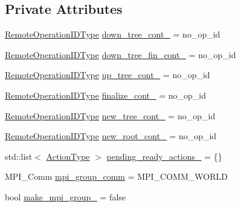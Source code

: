 \subsection*{Private Attributes}
\begin{DoxyCompactItemize}
\item 
\hyperlink{namespacevt_1_1group_a73f2624ddeb535b39a08b6524f26b244}{Remote\+Operation\+I\+D\+Type} \hyperlink{structvt_1_1group_1_1_info_coll_aa6f3626398eb4473b21bfb2a43ba3c96}{down\+\_\+tree\+\_\+cont\+\_\+} = no\+\_\+op\+\_\+id
\item 
\hyperlink{namespacevt_1_1group_a73f2624ddeb535b39a08b6524f26b244}{Remote\+Operation\+I\+D\+Type} \hyperlink{structvt_1_1group_1_1_info_coll_a05eef11154e3dc70bb84c6e3b4c3be6c}{down\+\_\+tree\+\_\+fin\+\_\+cont\+\_\+} = no\+\_\+op\+\_\+id
\item 
\hyperlink{namespacevt_1_1group_a73f2624ddeb535b39a08b6524f26b244}{Remote\+Operation\+I\+D\+Type} \hyperlink{structvt_1_1group_1_1_info_coll_acd4c40fa52015c16a54d9e793cecc700}{up\+\_\+tree\+\_\+cont\+\_\+} = no\+\_\+op\+\_\+id
\item 
\hyperlink{namespacevt_1_1group_a73f2624ddeb535b39a08b6524f26b244}{Remote\+Operation\+I\+D\+Type} \hyperlink{structvt_1_1group_1_1_info_coll_aa767d1c96a39903722351cd0cf758a94}{finalize\+\_\+cont\+\_\+} = no\+\_\+op\+\_\+id
\item 
\hyperlink{namespacevt_1_1group_a73f2624ddeb535b39a08b6524f26b244}{Remote\+Operation\+I\+D\+Type} \hyperlink{structvt_1_1group_1_1_info_coll_a80e7a5ae888fb9e6fae7e078caa773b4}{new\+\_\+tree\+\_\+cont\+\_\+} = no\+\_\+op\+\_\+id
\item 
\hyperlink{namespacevt_1_1group_a73f2624ddeb535b39a08b6524f26b244}{Remote\+Operation\+I\+D\+Type} \hyperlink{structvt_1_1group_1_1_info_coll_a95949a66470f57b28891e904902a3d51}{new\+\_\+root\+\_\+cont\+\_\+} = no\+\_\+op\+\_\+id
\item 
std\+::list$<$ \hyperlink{namespacevt_ae0a5a7b18cc99d7b732cb4d44f46b0f3}{Action\+Type} $>$ \hyperlink{structvt_1_1group_1_1_info_coll_a5e7383d63fbf0b7ab79a5681cb19e421}{pending\+\_\+ready\+\_\+actions\+\_\+} = \{\}
\item 
M\+P\+I\+\_\+\+Comm \hyperlink{structvt_1_1group_1_1_info_coll_a937b6f4d007f4d583b8b8999936221d2}{mpi\+\_\+group\+\_\+comm} = M\+P\+I\+\_\+\+C\+O\+M\+M\+\_\+\+W\+O\+R\+LD
\item 
bool \hyperlink{structvt_1_1group_1_1_info_coll_a1cd784e21b1e11f16eb5359ad8e34ac8}{make\+\_\+mpi\+\_\+group\+\_\+} = false
\end{DoxyCompactItemize}


